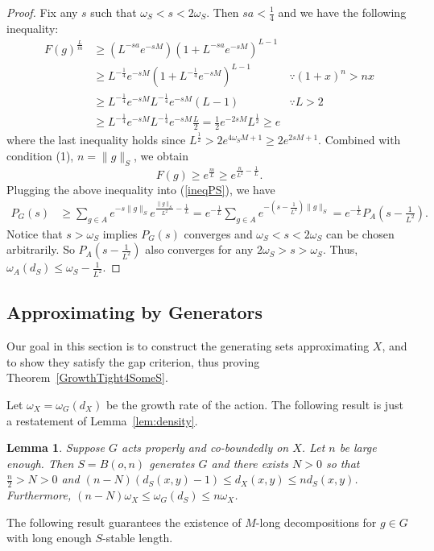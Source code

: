 \documentclass{amsart}
\numberwithin{thm}{section}
\numberwithin{figure}{section}
\newtheorem{lem}[thm]{Lemma}
\theoremstyle{definition}
\theoremstyle{definition}
\theoremstyle{remark}
\numberwithin{equation}{section}
\theoremstyle{plain}
\begin{document}
\begin{proof}
	Fix any $s$ such that $\omega_S < s < 2\omega_S$. Then $sa < \frac{1}{4}$ and we have the following inequality:
	\[\begin{aligned}
		F(g)^{\frac{L}{m}} &\ge (L^{-sa} e^{-sM}) (1+L^{-sa} e^{-sM})^{L-1} &\\
		&\ge L^{-\frac{1}{4}} e^{-sM} (1+L^{-\frac{1}{4}} e^{-sM})^{L-1} &  \because (1+x)^n  > nx \\
		&\ge L^{-\frac{1}{4}} e^{-sM} L^{-\frac{1}{4}} e^{-sM}(L-1) & \because  L>2\\
		&\ge L^{-\frac{1}{4}} e^{-sM} L^{-\frac{1}{4}} e^{-sM}\frac{L}{2} = \frac{1}{2} e^{-2sM} L^{\frac{1}{2}} \ge e &
	\end{aligned}\]
	where the last inequality holds since $L^{\frac{1}{2}} > 2 e^{4\omega_S M + 1} \ge 2 e^{2s M + 1}$. Combined with condition (1), $n = \|g\|_S$, we obtain \[F(g) \ge e^{\frac{m}{L}} \ge e^{\frac{n}{L^2} - \frac{1}{L}}.\]
	Plugging the above inequality into (\ref{ineqPS}), we have
	\[\begin{aligned}
		P_G(s) &\ge \sum_{g\in A} e^{-s \|g\|_S} e^{\frac{ \|g\|_S}{L^2} - \frac{1}{L}} = e^{-\frac{1}{L}} \sum_{g\in A} e^{-(s - \frac{1}{L^2}) \|g\|_S} = e^{-\frac{1}{L}} P_A(s - \frac{1}{L^2}).
	\end{aligned}\]
	Notice that $s > \omega_S$ implies $P_G(s)$ converges and $\omega_S < s < 2\omega_S$ can be chosen arbitrarily. So $P_A(s - \frac{1}{L^2})$ also converges for any $2\omega_S > s > \omega_S$. Thus, $\omega_A(d_{S}) \le \omega_S - \frac{1}{L^2}$.
\end{proof}
\subsection{Approximating by Generators}
Our goal in this section is to construct the generating sets approximating $X$, and to show they satisfy the gap criterion, thus proving Theorem~\ref{GrowthTight4SomeS}.

Let $\omega_X = \omega_G(d_X)$ be the growth rate of the action. The following result is just a restatement of Lemma~\ref{lem:density}.

\begin{lem}\label{approByBall}
	Suppose $G$ acts properly and co-boundedly   on $X$. Let $n$ be large enough. Then $S = B(o, n)$ generates $G$ and there exists $N>0$ so that $\frac{n}{2} > N > 0$ and $(n-N) (d_S(x, y)-1) \le d_X(x, y) \le n d_S(x, y)$. Furthermore, $(n - N) \omega_X \le \omega_G(d_{S}) \le n \omega_X$.
\end{lem}
\iffalse
The following result guarantees the existence of $M$-long decompositions for $g \in G$ with long enough $S$-stable length.
\end{document}
